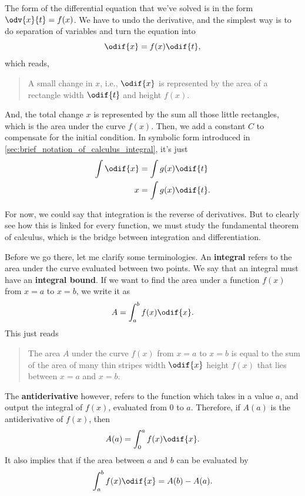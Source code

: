The form of the differential equation that we've solved is in the form $\odv{x}{t} = f(x)$. We have to undo the derivative, and the simplest way is to do separation of variables and turn the equation into
\begin{equation}
	\odif{x} = f(x)\odif{t},
\end{equation}
which reads,
\begin{quotation}
	A small change in $x$, i.e., $\odif{x}$ is represented by the area of a rectangle width $\odif{t}$ and height $f(x)$.
\end{quotation}
And, the total change $x$ is represented by the sum all those little rectangles, which is the area under the curve $f(x)$. Then, we add a constant $C$ to compensate for the initial condition. In symbolic form introduced in \cref{sec:brief_notation_of_calculus_integral}, it's just
\begin{align}
	\int\odif{x} & = \int g(x)\odif{t}  \\
	x            & = \int g(x)\odif{t}.
\end{align}

For now, we could say that integration is the reverse of derivatives. But to clearly see how this is linked for every function, we must study the fundamental theorem of calculus, which is the bridge between integration and differentiation.

Before we go there, let me clarify some terminologies. An \textbf{integral} refers to the area under the curve evaluated between two points. We say that an integral must have an \textbf{integral bound}. If we want to find the area under a function $f(x)$ from $x = a$ to $x = b$, we write it as
\begin{equation}
	A = \int_a^b f(x)\odif{x}.
\end{equation}
This just reads
\begin{quotation}
	The area $A$ under the curve $f(x)$ from $x = a$ to $x = b$ is equal to the sum of the area of many thin stripes width $\odif{x}$ height $f(x)$ that lies between $x = a$ and $x = b$.
\end{quotation}
The \textbf{antiderivative} however, refers to the function which takes in a value $a$, and output the integral of $f(x)$, evaluated from $0$ to $a$. Therefore, if $A(a)$ is the antiderivative of $f(x)$, then
\begin{equation}
	A(a) = \int_0^a f(x)\odif{x}.
\end{equation}
It also implies that if the area between $a$ and $b$ can be evaluated by
\begin{equation}
	\int_a^b f(x)\odif{x} = A(b) - A(a).
\end{equation}

